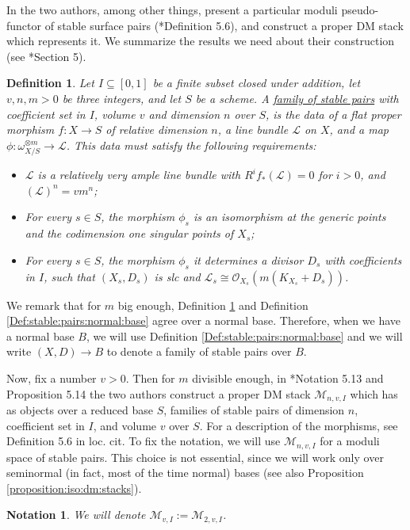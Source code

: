 \documentclass[11pt]{amsart}
\newcommand{\sL}{\mathscr{L}}
\newcommand{\sM}{\mathscr{M}}
\newcommand{\cO}{\mathcal{O}}
\newtheorem{Def}[theorem]{Definition}
\newtheorem{Notation}[theorem]{Notation}
\theoremstyle{definition}
\begin{document}
In \cite{KP} the two authors, among other things, present a particular moduli pseudo-functor of stable surface pairs (\cite{KP}*{Definition 5.6}),
and construct a proper DM stack
which represents it. We summarize the results we need about their construction (see \cite{KP}*{Section 5}).
\begin{Def}\label{Def:KP:stable:pairs}
 Let $I \subseteq [0,1]$ be a finite subset closed under addition, let $v,n,m > 0$ be three integers, and let $S$ be a scheme.
 A \underline{family of stable pairs} with coefficient set in $I$, volume $v$ and dimension $n$ over $S$,
 is the data of a flat proper morphism $f:X \to S$ of relative dimension $n$, a line bundle $\sL$ on $X$, and a map
 $\phi: \omega_{X/S}^{\otimes m} \to \sL$. This data must satisfy the following requirements:
 \begin{itemize}
  \item $\sL$ is a relatively very ample line bundle with $R^if_*(\sL)=0$ for $i>0$, and $(\sL)^n =vm^n$;
  \item For every $s \in S$, the morphism $\phi_s$ is an isomorphism at the generic points and the codimension one singular points of $X_s$;
  \item For every $s \in S$, the morphism $\phi_s$ it determines
  a divisor $D_s$ with coefficients in $I$, such that $(X_s,D_s)$ is slc and $\sL_s \cong \cO_{X_s}(m(K_{X_s}+D_s))$.
 \end{itemize}
\end{Def}
We remark that for $m$ big enough, Definition \ref{Def:KP:stable:pairs} and Definition \ref{Def:stable:pairs:normal:base} agree over a normal base. Therefore, when we have a normal base $B$, we will use Definition \ref{Def:stable:pairs:normal:base} and we will write $(X,D) \to B$ to denote a family of stable pairs over $B$. 

Now, fix a number $v >0$. Then for $m$ divisible enough, in
\cite{KP}*{Notation 5.13 and Proposition 5.14} the two authors construct a proper DM stack $\sM_{n,v,I}$
which has as objects over a reduced base $S$, families of stable pairs of dimension $n$, coefficient set in $I$, and volume $v$ over $S$.
For a description of the morphisms, see Definition 5.6 in loc. cit.
To fix the notation, we will use $\sM_{n,v,I}$ for a moduli space of stable pairs. This choice is not essential, since we will work only over seminormal
(in fact, most of the time normal) bases (see also Proposition \ref{proposition:iso:dm:stacks}).
\begin{Notation}
We will denote $\sM_{v,I}:=\sM_{2,v,I}$.
\end{Notation}
\end{document}

